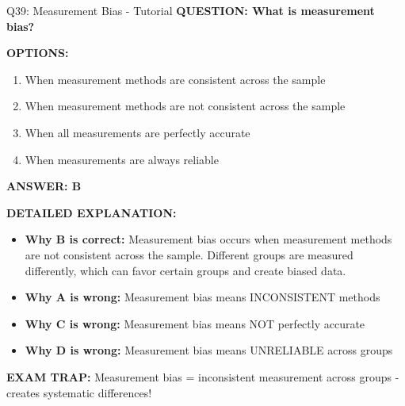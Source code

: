 \documentclass[8pt]{beamer}
\begin{document}
	\begin{frame}{Q39: Measurement Bias - Tutorial}
		\fontsize{6.5}{7.5}\selectfont
		\textbf{QUESTION: What is measurement bias?}
		
		\vspace{0.1cm}
		\textbf{OPTIONS:}
		\begin{enumerate}
			\item When measurement methods are consistent across the sample
			\item When measurement methods are not consistent across the sample
			\item When all measurements are perfectly accurate
			\item When measurements are always reliable
		\end{enumerate}
		
		\vspace{0.1cm}
		\textcolor{myblue}{\textbf{ANSWER: B}}
		
		\vspace{0.1cm}
		\textbf{DETAILED EXPLANATION:}
		\begin{itemize}
			\item \textbf{Why B is correct:} Measurement bias occurs when measurement methods are not consistent across the sample. Different groups are measured differently, which can favor certain groups and create biased data.
			\item \textbf{Why A is wrong:} Measurement bias means INCONSISTENT methods
			\item \textbf{Why C is wrong:} Measurement bias means NOT perfectly accurate
			\item \textbf{Why D is wrong:} Measurement bias means UNRELIABLE across groups
		\end{itemize}
		
		\textcolor{myred}{\textbf{EXAM TRAP:}} Measurement bias = \textcolor{myblue}{inconsistent measurement across groups} - creates systematic differences!
	\end{frame}
	
\end{document}
